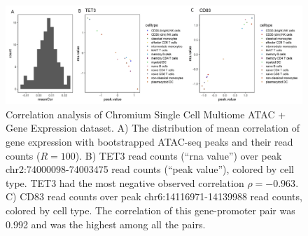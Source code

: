 \documentclass{article}
\begin{document}
\begin{figure}[htbp]
\centering
\includegraphics[scale=0.08]{Figures/sfig2.jpeg}
\caption{Correlation analysis of Chromium Single Cell
  Multiome ATAC + Gene Expression dataset. A) The distribution of mean
  correlation of gene expression with bootstrapped
  ATAC-seq peaks and their read counts ($R = 100$).
  B) TET3 read counts (``rna value'') over peak
  chr2:74000098-74003475 read counts (``peak value''),
  colored by cell type. TET3 had
  the most negative observed correlation $\rho = −0.963$.
  C) CD83 read
  counts over peak chr6:14116971-14139988 read counts, colored by cell
  type. The correlation of this gene-promoter pair was 
  0.992 and was the highest among all the pairs.}
\label{fig:suppfig3}
\end{figure}


%
%
%
%
%
%
%

\end{document}

